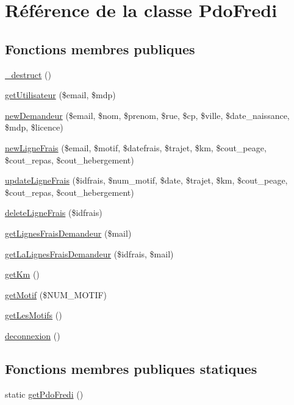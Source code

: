 \hypertarget{class_pdo_fredi}{}\section{Référence de la classe Pdo\+Fredi}
\label{class_pdo_fredi}
\subsection*{Fonctions membres publiques}
\begin{DoxyCompactItemize}
\item 
\hyperlink{class_pdo_fredi_a1c6024f681d3956654622d9f28e540a2}{\+\_\+destruct} ()
\item 
\hyperlink{class_pdo_fredi_ab7a163dd17d16734868bf88b698e0629}{get\+Utilisateur} (\$email, \$mdp)
\item 
\hyperlink{class_pdo_fredi_a4eb642f54ad574b37530ac472c4d5f85}{new\+Demandeur} (\$email, \$nom, \$prenom, \$rue, \$cp, \$ville, \$date\+\_\+naissance, \$mdp, \$licence)
\item 
\hyperlink{class_pdo_fredi_a497e67d28e10dfc2f25e18560123afbe}{new\+Ligne\+Frais} (\$email, \$motif, \$datefrais, \$trajet, \$km, \$cout\+\_\+peage, \$cout\+\_\+repas, \$cout\+\_\+hebergement)
\item 
\hyperlink{class_pdo_fredi_ab6ef637446cff167c74e4c7a4eabfe03}{update\+Ligne\+Frais} (\$idfrais, \$num\+\_\+motif, \$date, \$trajet, \$km, \$cout\+\_\+peage, \$cout\+\_\+repas, \$cout\+\_\+hebergement)
\item 
\hyperlink{class_pdo_fredi_a4e959696a4b3c9a53f08e086aac11312}{delete\+Ligne\+Frais} (\$idfrais)
\item 
\hyperlink{class_pdo_fredi_af1aaeb781863467e305ebf71a325ddf8}{get\+Lignes\+Frais\+Demandeur} (\$mail)
\item 
\hyperlink{class_pdo_fredi_ab20d05203b00e430a0f4373b0da62c03}{get\+La\+Lignes\+Frais\+Demandeur} (\$idfrais, \$mail)
\item 
\hyperlink{class_pdo_fredi_aa6203e1d4f8a89a6b837c01be42581c9}{get\+Km} ()
\item 
\hyperlink{class_pdo_fredi_ad09c889ade4715362a2f9a91ca3dfb5f}{get\+Motif} (\$N\+U\+M\+\_\+\+M\+O\+T\+I\+F)
\item 
\hyperlink{class_pdo_fredi_a14751fcb08935bb959ecdbeeaf7ec429}{get\+Les\+Motifs} ()
\item 
\hyperlink{class_pdo_fredi_a999ec8c14031968ce9d6ba2410105d4b}{deconnexion} ()
\end{DoxyCompactItemize}
\subsection*{Fonctions membres publiques statiques}
\begin{DoxyCompactItemize}
\item 
static \hyperlink{class_pdo_fredi_a8476065871bfa97da916e3f167e4255d}{get\+Pdo\+Fredi} ()
\end{DoxyCompactItemize}


